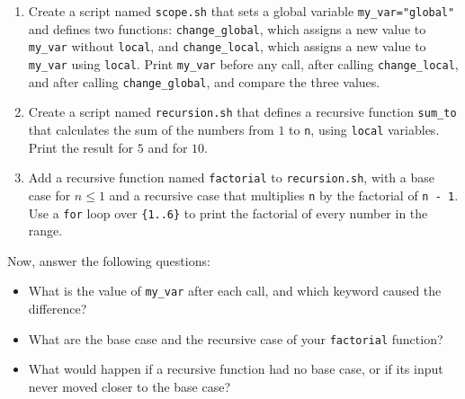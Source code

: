 \begin{enumerate}
    \item Create a script named \texttt{scope.sh} that sets a global variable \texttt{my\_var="global"} and defines two functions: \texttt{change\_global}, which assigns a new value to \texttt{my\_var} without \texttt{local}, and \texttt{change\_local}, which assigns a new value to \texttt{my\_var} using \texttt{local}. Print \texttt{my\_var} before any call, after calling \texttt{change\_local}, and after calling \texttt{change\_global}, and compare the three values.
    \item Create a script named \texttt{recursion.sh} that defines a recursive function \texttt{sum\_to} that calculates the sum of the numbers from $1$ to \texttt{n}, using \texttt{local} variables. Print the result for $5$ and for $10$.
    \item Add a recursive function named \texttt{factorial} to \texttt{recursion.sh}, with a base case for $n \le 1$ and a recursive case that multiplies \texttt{n} by the factorial of \texttt{n - 1}. Use a \texttt{for} loop over \texttt{\{1..6\}} to print the factorial of every number in the range.
\end{enumerate}

Now, answer the following questions:
\begin{itemize}
    \item What is the value of \texttt{my\_var} after each call, and which keyword caused the difference?
    \item What are the base case and the recursive case of your \texttt{factorial} function?
    \item What would happen if a recursive function had no base case, or if its input never moved closer to the base case?
\end{itemize}